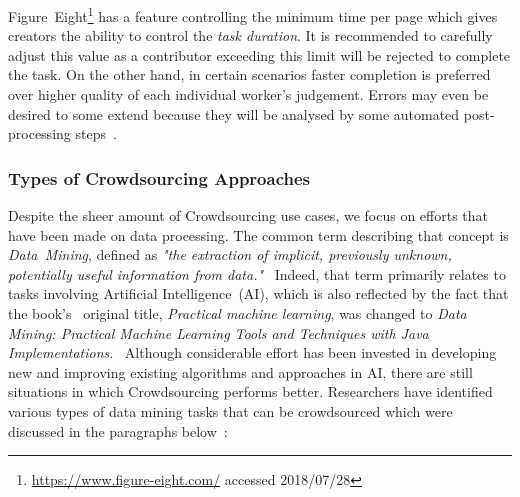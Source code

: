 \documentclass[draft,final]{vutinfth} %
\begin{document}
Figure~Eight\footnote{\url{https://www.figure-eight.com/} accessed 2018/07/28} has a feature controlling the minimum time per page which gives creators the ability to control the \emph{task duration}. It is recommended to carefully adjust this value as a contributor exceeding this limit will be rejected to complete the task. On the other hand, in certain scenarios faster completion is preferred over higher quality of each individual worker's judgement. Errors may even be desired to some extend because they will be analysed by some automated post-processing steps~\cite{krishna2016}. 

\subsubsection{Types of Crowdsourcing Approaches}
Despite the sheer amount of Crowdsourcing use cases, we focus on efforts that have been made on data processing. The common term describing that concept is \emph{Data~Mining}, defined as \emph{"the extraction of implicit, previously unknown, potentially useful information from data."}~\cite{witten2016}
Indeed, that term primarily relates to tasks involving Artificial Intelligence~(AI), which is also reflected by the fact that the book's~\cite{witten2000} original title, \emph{Practical machine learning}, was changed to \emph{Data Mining: Practical Machine Learning Tools and Techniques with Java Implementations}.~\cite{bouckaert2010} Although considerable effort has been invested in developing new and improving existing algorithms and approaches in AI, there are still situations in which Crowdsourcing performs better. Researchers have identified various types of data mining tasks that can be crowdsourced which were discussed in the paragraphs below~\cite{xintong2014, barbier2012, sabou2012}:
\end{document}
